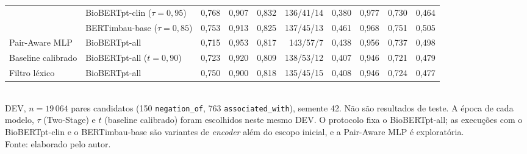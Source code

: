 \begin{table}[htbp]
{\begin{tabular}{llrrrrrrrr}
 & BioBERTpt-clin ($\tau=0{,}95$) & 0{,}768 & 0{,}907 & 0{,}832 & 136/41/14 & 0{,}380 & 0{,}977 & 0{,}730 & 0{,}464 \\
 & BERTimbau-base ($\tau=0{,}85$) & 0{,}753 & 0{,}913 & 0{,}825 & 137/45/13 & 0{,}461 & 0{,}968 & 0{,}751 & 0{,}505 \\
\midrule
Pair-Aware MLP & BioBERTpt-all & 0{,}715 & 0{,}953 & 0{,}817 & 143/57/7 & 0{,}438 & 0{,}956 & 0{,}737 & 0{,}498 \\
\midrule
Baseline calibrado & BioBERTpt-all ($t=0{,}90$) & 0{,}723 & 0{,}920 & 0{,}809 & 138/53/12 & 0{,}407 & 0{,}946 & 0{,}721 & 0{,}479 \\
\midrule
Filtro léxico & BioBERTpt-all & 0{,}750 & 0{,}900 & 0{,}818 & 135/45/15 & 0{,}408 & 0{,}946 & 0{,}724 & 0{,}477 \\
  \bottomrule
  \end{tabular}}\\[2pt]
  {\footnotesize DEV, $n=19\,064$ pares candidatos (150 \texttt{negation\_of}, 763 \texttt{associated\_with}), semente 42. Não são resultados de teste. A época de cada modelo, $\tau$ (Two-Stage) e $t$ (baseline calibrado) foram escolhidos neste mesmo DEV. O protocolo fixa o BioBERTpt-all; as execuções com o BioBERTpt-clin e o BERTimbau-base são variantes de \emph{encoder} além do escopo inicial, e a Pair-Aware MLP é exploratória.}\\[4pt]
  {\footnotesize Fonte: elaborado pelo autor.}
\end{table}
